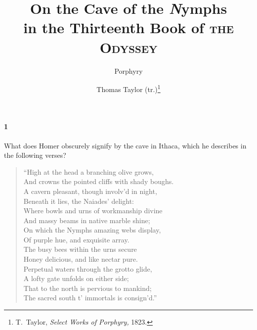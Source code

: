 \documentclass[12pt]{article}
\title{\Huge\swshape On the Cave of the \textit{N}ymphs\\in the Thirteenth Book of \textsc{the Odyssey}}
\author{Porphyry \and Thomas Taylor (tr.)\footnote{T.~Taylor, \textit{Select Works of Porphyry,} 1823.}}
\date{}
\begin{document}
\maketitle


\paragraph{1} What does Homer obscurely signify by the cave in Ithaca, which he
describes in the following verses?

\begin{verse}
``High at the head a branching olive grows,\\
And crowns the pointed cliffs with shady boughs.\\
A cavern pleasant, though involv'd in night,\\
Beneath it lies, the Naiades' delight:\\
Where bowls and urns of workmanship divine\\
And massy beams in native marble shine;\\
On which the Nymphs amazing webs display,\\
Of purple hue, and exquisite array.\\
The busy bees within the urns secure\\
Honey delicious, and like nectar pure.\\
Perpetual waters through the grotto glide,\\
A lofty gate unfolds on either side;\\
That to the north is pervious to mankind;\\
The sacred south t' immortals is consign'd.''
\end{verse}
\end{document}
